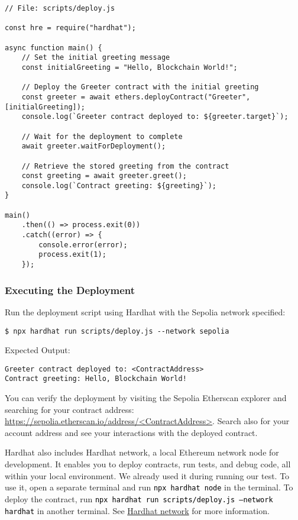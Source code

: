 \documentclass[12pt]{article}
\newcommand{\codegrey}[1]{%
  \texttt{\colorbox{black!4}{\textcolor{black}{#1}}}%
}
\begin{document}
\begin{verbatim}
// File: scripts/deploy.js

const hre = require("hardhat");

async function main() {
    // Set the initial greeting message
    const initialGreeting = "Hello, Blockchain World!";
    
    // Deploy the Greeter contract with the initial greeting
    const greeter = await ethers.deployContract("Greeter", [initialGreeting]);
    console.log(`Greeter contract deployed to: ${greeter.target}`);

    // Wait for the deployment to complete
    await greeter.waitForDeployment();

    // Retrieve the stored greeting from the contract
    const greeting = await greeter.greet();
    console.log(`Contract greeting: ${greeting}`);
}

main()
    .then(() => process.exit(0))
    .catch((error) => {
        console.error(error);
        process.exit(1);
    });
\end{verbatim}

\subsubsection{Executing the Deployment}

Run the deployment script using Hardhat with the Sepolia network specified:

\begin{verbatim}
$ npx hardhat run scripts/deploy.js --network sepolia
\end{verbatim}
Expected Output:
\begin{verbatim}
Greeter contract deployed to: <ContractAddress>
Contract greeting: Hello, Blockchain World!
\end{verbatim}
You can verify the deployment by visiting the Sepolia Etherscan explorer and searching for your contract address: \url{https://sepolia.etherscan.io/address/<ContractAddress>}. Search also for your account address and see your interactions with the deployed contract.

\noindent
Hardhat also includes Hardhat network, a local Ethereum network node for development. It enables you to deploy contracts, run tests, and debug code, all within your local environment. We already used it during running our test. To use it, open a separate terminal and run \codegrey{npx hardhat node} in the terminal. To deploy the contract, run \codegrey{npx hardhat run scripts/deploy.js --network hardhat} in another terminal. See \href{https://hardhat.org/hardhat-network/docs/overview\#hardhat-network}{Hardhat network} for more information.
\end{document}
